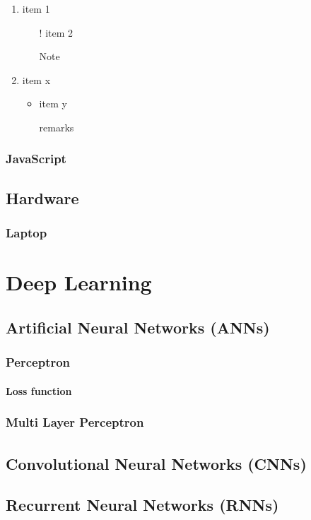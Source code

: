 \documentclass[12pt,a4paper]{report}
\begin{document}
\begin{enumerate}
    \item item 1
    \begin{itemize}
        \item[!] item 2
        \begin{description}
            \item[Note] \lipsum[2] 
        \end{description}
    \end{itemize}
    \item item x
    \begin{itemize}
        \item item y
        \begin{description}
            \item[remarks] \lipsum[2] 
        \end{description}
    \end{itemize}
\end{enumerate}
\subsection{JavaScript}
\lipsum[5]

\section{Hardware}
\subsection{Laptop}
\lipsum[3]

\chapter{Deep Learning}
\section{Artificial Neural Networks (ANNs)}
\lipsum[2]
\subsection{Perceptron}
\lipsum[1]
\subsubsection{Loss function}
\lipsum[3]
\subsection{Multi Layer Perceptron}
\paragraph{\lipsum[4]}
\subparagraph{\lipsum[5]}
\section{Convolutional Neural Networks (CNNs)}
\lipsum[2-4]
\section{Recurrent Neural Networks (RNNs)}
\lipsum[5]
\end{document}
